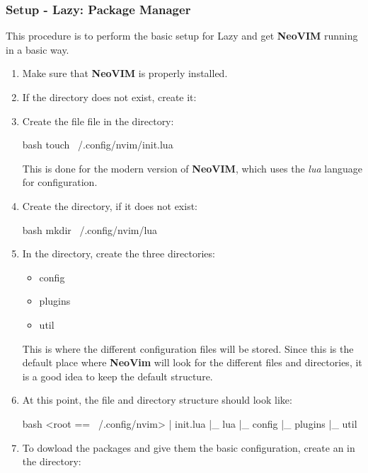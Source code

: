 \subsubsection{Setup - Lazy: Package Manager}
This procedure is to perform the basic setup for Lazy and get \textbf{NeoVIM} running in a basic
way.
\begin{enumerate}
    \item Make sure that \textbf{NeoVIM} is properly installed.
    \item If the directory  does not exist,
    create it:
    \item Create the file  file in the directory:
    \begin{mintedbox}{bash}
touch ~/.config/nvim/init.lua
    \end{mintedbox}
    This is done for the modern version of \textbf{NeoVIM}, which uses the \textit{lua} language for
    configuration.
    \item Create the  directory, if
    it does not exist:
    \begin{mintedbox}{bash}
mkdir ~/.config/nvim/lua
    \end{mintedbox}
    \item In the  directory, create the three directories:
    \begin{itemize}
        \item config
        \item plugins
        \item util
    \end{itemize}
    This is where the different configuration files will be stored. Since this is the default place
    where \textbf{NeoVim} will look for the different files and directories, it is a good idea to
    keep the default structure.
    \item At this point, the file and directory structure should look like:
    \begin{mintedbox}{bash}
<root == ~/.config/nvim>
| init.lua
|_ lua
    |_ config
    |_ plugins
    |_ util
    \end{mintedbox}
    \item To dowload the packages and give them the basic configuration, create an
     in the  directory:

\end{enumerate}
